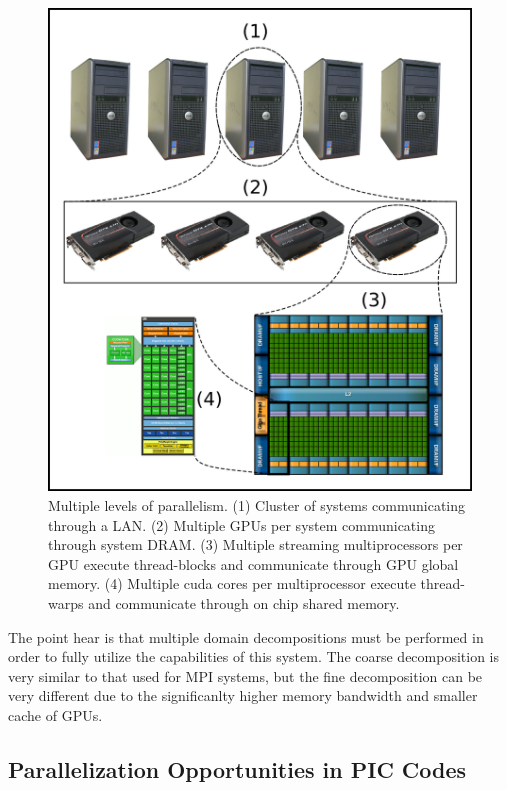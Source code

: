 \begin{figure}
\begin{center}
\includegraphics[width=5in]{introduction/multi_parallel.png}
\end{center}
\caption{Multiple levels of parallelism. (1) Cluster of systems communicating through a LAN. (2) Multiple GPUs per system communicating through system DRAM. (3) Multiple streaming multiprocessors per GPU execute thread-blocks and communicate through GPU global memory. (4) Multiple cuda cores per multiprocessor execute thread-warps and communicate through on chip shared memory. }
\label{fig:multiparallel}
\end{figure}

The point hear is that multiple domain decompositions must be performed in order to fully utilize the capabilities of this system. The coarse decomposition is very similar to that used for MPI systems, but the fine decomposition can be very different due to the significanlty higher memory bandwidth and smaller cache of GPUs. 

		\subsection{Parallelization Opportunities in PIC Codes}

